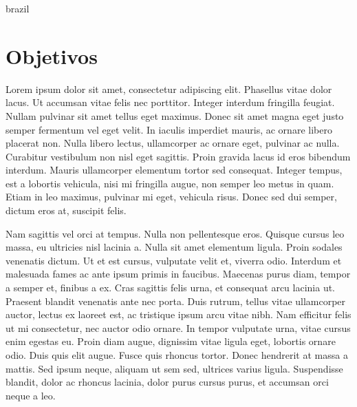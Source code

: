 \begin{otherlanguage*}{brazil}
        \section*{Objetivos}
        Lorem ipsum dolor sit amet, consectetur adipiscing elit. Phasellus vitae dolor lacus. Ut
        accumsan vitae felis nec porttitor. Integer interdum fringilla feugiat. Nullam pulvinar sit
        amet tellus eget maximus. Donec sit amet magna eget justo semper fermentum vel eget velit.
        In iaculis imperdiet mauris, ac ornare libero placerat non. Nulla libero lectus, ullamcorper
        ac ornare eget, pulvinar ac nulla. Curabitur vestibulum non nisl eget sagittis. Proin
        gravida lacus id eros bibendum interdum. Mauris ullamcorper elementum tortor sed consequat.
        Integer tempus, est a lobortis vehicula, nisi mi fringilla augue, non semper leo metus in
        quam. Etiam in leo maximus, pulvinar mi eget, vehicula risus. Donec sed dui semper, dictum
        eros at, suscipit felis.

        Nam sagittis vel orci at tempus. Nulla non pellentesque eros.
        Quisque cursus leo massa, eu ultricies nisl lacinia a. Nulla sit amet elementum ligula.
        Proin sodales venenatis dictum. Ut et est cursus, vulputate velit et, viverra odio. Interdum
        et malesuada fames ac ante ipsum primis in faucibus. Maecenas purus diam, tempor a semper
        et, finibus a ex. Cras sagittis felis urna, et consequat arcu lacinia ut. Praesent blandit
        venenatis ante nec porta. Duis rutrum, tellus vitae ullamcorper auctor, lectus ex laoreet
        est, ac tristique ipsum arcu vitae nibh. Nam efficitur felis ut mi consectetur, nec auctor
        odio ornare. In tempor vulputate urna, vitae cursus enim egestas eu. Proin diam augue,
        dignissim vitae ligula eget, lobortis ornare odio. Duis quis elit augue. Fusce quis rhoncus
        tortor. Donec hendrerit at massa a mattis. Sed ipsum neque, aliquam ut sem sed, ultrices
        varius ligula. Suspendisse blandit, dolor ac rhoncus lacinia, dolor purus cursus purus, et
        accumsan orci neque a leo.


\end{otherlanguage*}
